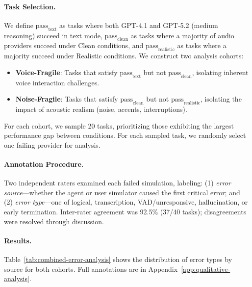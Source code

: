 \paragraph{Task Selection.} We define $\text{pass}_{\text{text}}$ as tasks where both GPT-4.1 and GPT-5.2 (medium reasoning) succeed in text mode, $\text{pass}_{\text{clean}}$ as tasks where a majority of audio providers succeed under Clean conditions, and $\text{pass}_{\text{realistic}}$ as tasks where a majority succeed under Realistic conditions. We construct two analysis cohorts:
\begin{itemize}[nosep,leftmargin=*]
    \item \textbf{Voice-Fragile}: Tasks that satisfy $\text{pass}_{\text{text}}$ but not $\text{pass}_{\text{clean}}$, isolating inherent voice interaction challenges.
    \item \textbf{Noise-Fragile}: Tasks that satisfy $\text{pass}_{\text{clean}}$ but not $\text{pass}_{\text{realistic}}$, isolating the impact of acoustic realism (noise, accents, interruptions).
\end{itemize}
For each cohort, we sample 20 tasks, prioritizing those exhibiting the largest performance gap between conditions. For each sampled task, we randomly select one failing provider for analysis.

\paragraph{Annotation Procedure.} Two independent raters examined each failed simulation, labeling: (1) \textit{error source}---whether the agent or user simulator caused the first critical error; and (2) \textit{error type}---one of logical, transcription, VAD/unresponsive, hallucination, or early termination. Inter-rater agreement was 92.5\% (37/40 tasks); disagreements were resolved through discussion.

\paragraph{Results.} Table~\ref{tab:combined-error-analysis} shows the distribution of error types by source for both cohorts. Full annotations are in Appendix~\ref{app:qualitative-analysis}.

\begin{table}[h]
\caption{Error analysis: distribution of error types by source. Agent errors dominate in both cohorts (75\% and 90\%).}
\label{tab:combined-error-analysis}
\centering
\begin{small}
\resizebox{0.85\columnwidth}{!}{%

}
\end{small}
\end{table}

